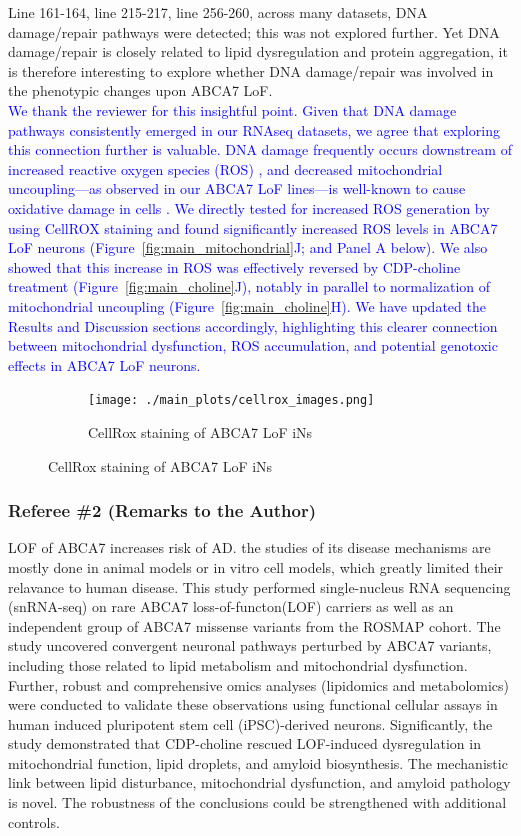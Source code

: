 \documentclass[12pt]{article}
\begin{document}
Line 161-164, line 215-217, line 256-260, across many datasets, DNA damage/repair pathways were detected; this was not explored further. Yet DNA damage/repair is closely related to lipid dysregulation and protein aggregation, it is therefore interesting to explore whether DNA damage/repair was involved in the phenotypic changes upon ABCA7 LoF.\\
\textcolor{blue}{We thank the reviewer for this insightful point. Given that DNA damage pathways consistently emerged in our RNAseq datasets, we agree that exploring this connection further is valuable. DNA damage frequently occurs downstream of increased reactive oxygen species (ROS) \cite{Welch2022-bp}, and decreased mitochondrial uncoupling—as observed in our ABCA7 LoF lines—is well-known to cause oxidative damage in cells \cite{Jain2024-br, Crivelli2024-pf}. We directly tested for increased ROS generation by using CellROX staining and found significantly increased ROS levels in ABCA7 LoF neurons (Figure~\ref{fig:main_mitochondrial}J; and Panel A below). We also showed that this increase in ROS was effectively reversed by CDP-choline treatment (Figure~\ref{fig:main_choline}J), notably in parallel to normalization of mitochondrial uncoupling (Figure~\ref{fig:main_choline}H). We have updated the Results and Discussion sections accordingly, highlighting this clearer connection between mitochondrial dysfunction, ROS accumulation, and potential genotoxic effects in ABCA7 LoF neurons.}

\begin{figure}[H] 
	\centering
	\begin{subfigure}[t]{.7\textwidth}
		\caption{CellRox staining of ABCA7 LoF iNs}
		\texttt{[image: ./main\_plots/cellrox\_images.png]}        
	\end{subfigure}  
\end{figure} \clearpage
\subsubsection*{Referee \#2 (Remarks to the Author)}
LOF of ABCA7 increases risk of AD. the studies of its disease mechanisms are mostly done in animal models or in vitro cell models, which greatly limited their relavance to human disease. This study performed single-nucleus RNA sequencing (snRNA-seq) on rare ABCA7 loss-of-functon(LOF) carriers as well as an independent group of ABCA7 missense variants from the ROSMAP cohort. The study uncovered convergent neuronal pathways perturbed by ABCA7 variants, including those related to lipid metabolism and mitochondrial dysfunction. Further, robust and comprehensive omics analyses (lipidomics and metabolomics) were conducted to validate these observations using functional cellular assays in human induced pluripotent stem cell (iPSC)-derived neurons. Significantly, the study demonstrated that CDP-choline rescued LOF-induced dysregulation in mitochondrial function, lipid droplets, and amyloid biosynthesis. The mechanistic link between lipid disturbance, mitochondrial dysfunction, and amyloid pathology is novel. The robustness of the conclusions could be strengthened with additional controls.
\end{document}
